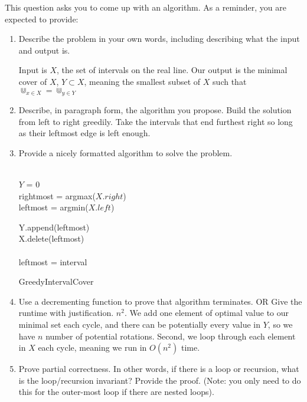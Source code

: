\documentclass{article}
\begin{document}
This question asks you to come up with an algorithm.  As a reminder, you are
expected to provide:
\begin{enumerate}
    \item Describe the problem in your own words, including
        describing what the input and output is.

		Input is $X$, the set of intervals on the real line. Our output
		is the minimal cover of $X$, $Y\subset X$, meaning the smallest subset of $X$
		such that $\Cup_{x\in X} = \Cup_{y \in Y}$
    \item Describe, in paragraph form, the algorithm you propose.
	    Build the solution from left to right greedily. Take the intervals
		that end furthest right so long as their leftmost edge is left
		enough.
    \item Provide a nicely formatted algorithm to solve the problem.
\begin{algorithm}[H]
 \\
	$Y$ = 0\\

	rightmost = argmax($X.right$)\\
	leftmost = argmin($X.left$)\\


	{

		Y.append(leftmost)\\
		X.delete(leftmost)\\

		{
			\\{leftmost = interval}
			}
			}

 \caption{GreedyIntervalCover}
\end{algorithm}
    \item Use a decrementing function to prove that algorithm terminates.
            OR  Give the runtime with justification.
		$n^2$. We add one element of optimal value to our minimal set
		each cycle, and there can be potentially every value in $Y$, so
		we have $n$ number of potential rotations. Second, we loop through each element in $X$ each cycle, meaning we run in $O(n^2)$ time.
		
    \item Prove partial correctness.  In other words, if there is a loop or
        recursion, what is the loop/recursion invariant? Provide the proof.
        (Note: you only need to do this for the outer-most loop if there are
        nested loops).


\end{enumerate}
\end{document}
